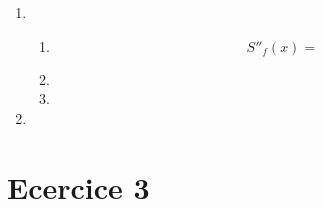 \documentclass{article}
\begin{document}
\begin{enumerate}

\item

  \begin{enumerate}

  \item

    \begin{equation*}
      S''_f(x) = 
    \end{equation*}

  \item

  \item

  \end{enumerate}

\item 
  
\end{enumerate}

\section*{Ecercice 3}
\end{document}
